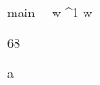 \documentclass[12pt,a4paper]{book}
\begin{document}
%
\begin{eqcode}{main}{\ }{\ }{}
    w \in {}^1 \lend
    w \gets \begin{tmatrix}
        68        \lend
    \end{tmatrix} \lend
    a \gets {} \lend
     \lend 
\end{eqcode}
\end{document}
